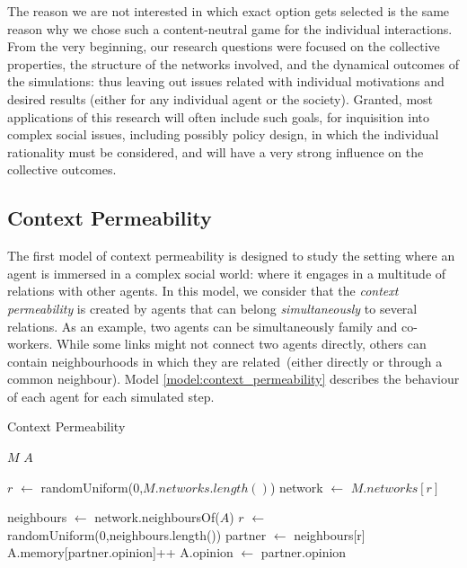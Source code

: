 \documentclass[preprint,number]{elsarticle}
\begin{document}
	The reason we are not interested in which exact option gets selected is the same reason why
        we chose such a content-neutral game for the individual interactions. From the very
        beginning, our research questions were focused on the collective properties, the structure
        of the networks involved, and the dynamical outcomes of the simulations: thus leaving out
        issues related with individual motivations and desired results (either for any individual
        agent or the society). Granted, most applications of this research will often include such
        goals, for inquisition into complex social issues, including possibly policy design, in
        which the individual rationality must be considered, and will have a very strong influence
        on the collective outcomes.
	
	\subsection{Context Permeability}
        \noindent The first model of context permeability \cite{Antunes2007,Antunes2010} is designed
        to study the setting where an agent is immersed in a complex social world: where it engages
        in a multitude of relations with other agents. In this model, we consider that the
        \textit{context permeability} is created by agents that can belong \textit{simultaneously}
        to several relations. As an example, two agents can be simultaneously family and
        co-workers. While some links might not connect two agents directly, others can contain
        neighbourhoods in which they are related~(either directly or through a common
        neighbour). Model \ref{model:context_permeability} describes the behaviour of each agent for
        each simulated step.
	\begin{algorithm}[H]
		\caption{Context Permeability}
		\label{model:context_permeability}
		\begin{algorithmic}
			\vspace{0.5em}
			\STATE $M$ 
			\STATE $A$ 
			\\ \hrulefill 
			
			\STATE{}
			\STATE $r$ $\leftarrow$ randomUniform(0,$ M.networks.length() $)
			\STATE network $\leftarrow$ $M.networks[r]$
			
			\STATE
			\STATE {}
			\STATE neighbours $\leftarrow$ network.neighboursOf($A$) 
			\STATE $r$ $\leftarrow$ randomUniform(0,neighbours.length())
			\STATE partner $\leftarrow$ neighbours[r]
			\STATE
			\STATE {}
			\STATE {}
			\STATE A.memory[partner.opinion]++
			\STATE A.opinion $\leftarrow$ partner.opinion
			\ENDIF
		\end{algorithmic}
	\end{algorithm}
\end{document}
